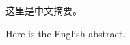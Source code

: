 \begin{cabstract}
这里是中文摘要。
\end{cabstract}

\begin{eabstract}
Here is the English abstract.
\end{eabstract}

